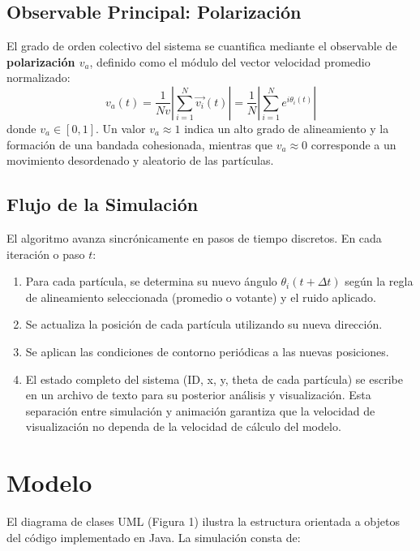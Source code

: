 \documentclass{article}
\begin{document}
\subsection{Observable Principal: Polarización}
El grado de orden colectivo del sistema se cuantifica mediante el observable de \textbf{polarización $v_a$}, definido como el módulo del vector velocidad promedio normalizado:
\begin{equation}
v_a(t) = \frac{1}{N v} \left| \sum_{i=1}^{N} \vec{v_i}(t) \right| = \frac{1}{N} \left| \sum_{i=1}^{N} e^{i \theta_i(t)} \right|
\label{eq:posicion}
\end{equation}
donde $v_a \in [0, 1]$. Un valor $v_a \approx 1$ indica un alto grado de alineamiento y la formación de una bandada cohesionada, mientras que $v_a \approx 0$ corresponde a un movimiento desordenado y aleatorio de las partículas.

\subsection{Flujo de la Simulación}
El algoritmo avanza sincrónicamente en pasos de tiempo discretos. En cada iteración o paso $t$:
\begin{enumerate}
\item Para cada partícula, se determina su nuevo ángulo $\theta_i(t + \Delta t)$ según la regla de alineamiento seleccionada (promedio o votante) y el ruido aplicado.
\item Se actualiza la posición de cada partícula utilizando su nueva dirección.
\item Se aplican las condiciones de contorno periódicas a las nuevas posiciones.
\item El estado completo del sistema (ID, x, y, theta de cada partícula) se escribe en un archivo de texto para su posterior análisis y visualización. Esta separación entre simulación y animación garantiza que la velocidad de visualización no dependa de la velocidad de cálculo del modelo.
\end{enumerate}

\section{Modelo}
El diagrama de clases UML (Figura 1) ilustra la estructura orientada a objetos del código implementado en Java. La simulación consta de:
\end{document}
